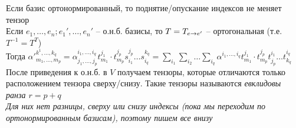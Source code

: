 \documentclass[12pt]{article}
\begin{document}
Если базис ортонормированный, то поднятие/опускание индексов не меняет тензор\\
Если $e_1, \ldots, e_n; e_1', \ldots, e_n'$ -- о.н.б. базисы, то $T = T_{e\rightarrow e'}$ -- ортогональная (т.е. $T^{-1} = T^T$)\\
Тогда $\alpha'^{k^1, \ldots, k_q}_{m_1,\ldots, m_p} = \alpha_{j_1, \ldots, j_p}^{i_1, \ldots, i_q} t^{j_1}_{m_1}\cdot t_{m_p}^{j_p} s_{i_1}^{j_p} \ldots s_{i_q}^{k_q} = \sum_{i_1}\sum_{i_2}\ldots\sum_{i_q} \alpha^{i_1,\ldots, i_q} t^{j_1}_{m_1}\cdot t_{m_p}^{j_p} t^{i_1}_{j_p} \ldots t^{i_q}_{k_q}$\\
После приведения к о.н.б. в $V$ получаем тензоры, которые отличаются только расположением тензора сверху/снизу. Такие тензоры называются \it{евклидовы} ранза $r=p+q$\\
Для них нет разницы, сверху или снизу индексы (пока мы переходим по ортонормированным базисам), поэтому пишем все внизу\\
\end{document}
